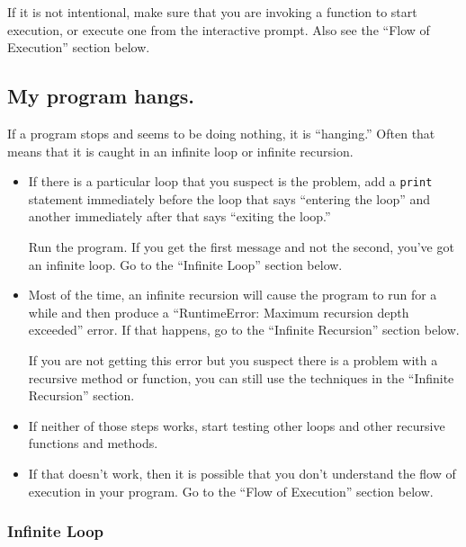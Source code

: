\documentclass[10pt]{book}
\begin{document}
If it is not intentional, make sure that you
are invoking a function to start execution, or execute one from
the interactive prompt.  Also see the ``Flow of Execution'' section
below.


\subsection{My program hangs.}

If a program stops and seems to be doing nothing, it is ``hanging.''
Often that means that it is caught in an infinite loop or infinite
recursion.

\begin{itemize}

\item If there is a particular loop that you suspect is the
problem, add a {\tt print} statement immediately before the loop that says
``entering the loop'' and another immediately after that says
``exiting the loop.''

Run the program.  If you get the first message and not the second,
you've got an infinite loop.  Go to the ``Infinite Loop'' section
below.

\item Most of the time, an infinite recursion will cause the program
to run for a while and then produce a ``RuntimeError: Maximum
recursion depth exceeded'' error.  If that happens, go to the
``Infinite Recursion'' section below.

If you are not getting this error but you suspect there is a problem
with a recursive method or function, you can still use the techniques
in the ``Infinite Recursion'' section.

\item If neither of those steps works, start testing other
loops and other recursive functions and methods.

\item If that doesn't work, then it is possible that
you don't understand the flow of execution in your program.
Go to the ``Flow of Execution'' section below.

\end{itemize}


\subsubsection{Infinite Loop}
\end{document}

